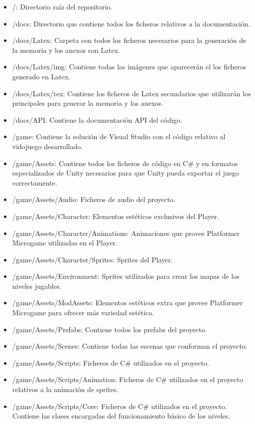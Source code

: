 \begin{itemize}
\item
/: Directorio raíz del repositorio.
\item
/docs: Directorio que contiene todos los ficheros relativos a la documentación.
\item
/docs/Latex: Carpeta con todos los ficheros necesarios para la generación de la memoria y los anexos con Latex.
\item
/docs/Latex/img: Contiene todas las imágenes que aparecerán el los ficheros generado en Latex.
\item
/docs/Latex/tex: Contiene los ficheros de Latex secundarios que utilizarán los principales para generar la memoria y los anexos.
\item
/docs/API: Contiene la documentación API del código.
\item
/game: Contiene la solución de Visual Studio con el código relativo al vidojuego desarrollado.
\item
/game/Assets: Contiene todos los ficheros de código en C\# y en formatos especializados de Unity necesarios para que Unity pueda exportar el juego correctamente.
\item
/game/Assets/Audio: Ficheros de audio del proyecto.
\item
/game/Assets/Character: Elementos estéticos exclusivos del Player.
\item
/game/Assets/Character/Animations: Animaciones que provee Platformer Microgame utilizadas en el Player.
\item
/game/Assets/Character/Sprites: Sprites del Player.
\item
/game/Assets/Environment: Sprites utilizados para crear los mapas de los niveles jugables.
\item
/game/Assets/ModAssets: Elementos estéticos extra que provee Platformer Microgame para ofrecer más variedad estética.
\item
/game/Assets/Prefabs: Contiene todos los prefabs del proyecto.
\item
/game/Assets/Scenes: Contiene todas las escenas que conforman el proyecto.
\item
/game/Assets/Scripts: Ficheros de C\# utilizados en el proyecto.
\item
/game/Assets/Scripts/Animation: Ficheros de C\# utilizados en el proyecto relativos a la animación de sprites.
\item
/game/Assets/Scripts/Core: Ficheros de C\# utilizados en el proyecto. Contiene las clases encargadas del funcionamiento básico de los niveles.

\end{itemize}

